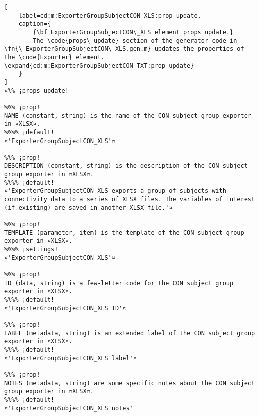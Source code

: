 \documentclass{tufte-handout}
\begin{document}
\begin{lstlisting}[
	label=cd:m:ExporterGroupSubjectCON_XLS:prop_update,
	caption={
		{\bf ExporterGroupSubjectCON\_XLS element props update.}
		The \code{props\_update} section of the generator code in \fn{\_ExporterGroupSubjectCON\_XLS.gen.m} updates the properties of the \code{Exporter} element. \expand{cd:m:ExporterGroupSubjectCON_TXT:prop_update}
	}
]
¤%% ¡props_update!

%%% ¡prop!
NAME (constant, string) is the name of the CON subject group exporter in ¤XLSX¤.
%%%% ¡default!
¤'ExporterGroupSubjectCON_XLS'¤

%%% ¡prop!
DESCRIPTION (constant, string) is the description of the CON subject group exporter in ¤XLSX¤.
%%%% ¡default!
¤'ExporterGroupSubjectCON_XLS exports a group of subjects with connectivity data to a series of XLSX files. The variables of interest (if existing) are saved in another XLSX file.'¤

%%% ¡prop!
TEMPLATE (parameter, item) is the template of the CON subject group exporter in ¤XLSX¤.
%%%% ¡settings!
¤'ExporterGroupSubjectCON_XLS'¤

%%% ¡prop!
ID (data, string) is a few-letter code for the CON subject group exporter in ¤XLSX¤.
%%%% ¡default!
¤'ExporterGroupSubjectCON_XLS ID'¤

%%% ¡prop!
LABEL (metadata, string) is an extended label of the CON subject group exporter in ¤XLSX¤.
%%%% ¡default!
¤'ExporterGroupSubjectCON_XLS label'¤

%%% ¡prop!
NOTES (metadata, string) are some specific notes about the CON subject group exporter in ¤XLSX¤.
%%%% ¡default!
¤'ExporterGroupSubjectCON_XLS notes'
\end{lstlisting}
\end{document}
